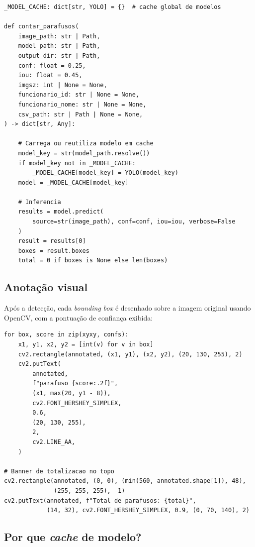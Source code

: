 \documentclass[12pt,a4paper]{article}
\begin{document}
\begin{lstlisting}[caption={Fun\c{c}\~ao principal de contagem (\texttt{screw\_counter.py})}]
_MODEL_CACHE: dict[str, YOLO] = {}  # cache global de modelos

def contar_parafusos(
    image_path: str | Path,
    model_path: str | Path,
    output_dir: str | Path,
    conf: float = 0.25,
    iou: float = 0.45,
    imgsz: int | None = None,
    funcionario_id: str | None = None,
    funcionario_nome: str | None = None,
    csv_path: str | Path | None = None,
) -> dict[str, Any]:

    # Carrega ou reutiliza modelo em cache
    model_key = str(model_path.resolve())
    if model_key not in _MODEL_CACHE:
        _MODEL_CACHE[model_key] = YOLO(model_key)
    model = _MODEL_CACHE[model_key]

    # Inferencia
    results = model.predict(
        source=str(image_path), conf=conf, iou=iou, verbose=False
    )
    result = results[0]
    boxes = result.boxes
    total = 0 if boxes is None else len(boxes)
\end{lstlisting}

\subsection{Anota\c{c}\~ao visual}

Ap\'os a detec\c{c}\~ao, cada \emph{bounding box} \'e desenhado sobre a imagem original
usando OpenCV, com a pontua\c{c}\~ao de confian\c{c}a exibida:

\begin{lstlisting}[caption={Desenho das caixas e contador (\texttt{screw\_counter.py})}]
for box, score in zip(xyxy, confs):
    x1, y1, x2, y2 = [int(v) for v in box]
    cv2.rectangle(annotated, (x1, y1), (x2, y2), (20, 130, 255), 2)
    cv2.putText(
        annotated,
        f"parafuso {score:.2f}",
        (x1, max(20, y1 - 8)),
        cv2.FONT_HERSHEY_SIMPLEX,
        0.6,
        (20, 130, 255),
        2,
        cv2.LINE_AA,
    )

# Banner de totalizacao no topo
cv2.rectangle(annotated, (0, 0), (min(560, annotated.shape[1]), 48),
              (255, 255, 255), -1)
cv2.putText(annotated, f"Total de parafusos: {total}",
            (14, 32), cv2.FONT_HERSHEY_SIMPLEX, 0.9, (0, 70, 140), 2)
\end{lstlisting}

\subsection{Por que \emph{cache} de modelo?}
\end{document}
